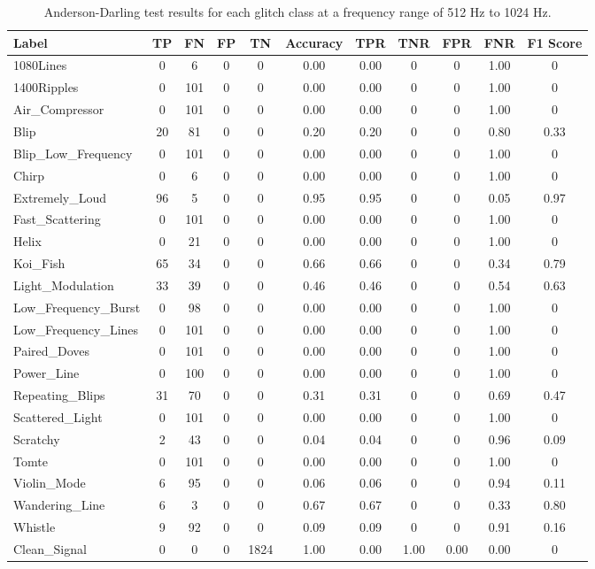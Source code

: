 \documentclass[12pt]{article}
\begin{document}
\begin{table}[H]
  \begin{tabular}{lcccccccccc}
  \toprule
  Label & TP & FN & FP & TN & Accuracy & TPR & TNR & FPR & FNR & F1 Score \\
  \midrule
  1080Lines & 0 & 6 & 0 & 0 & 0.00 & 0.00 & 0 & 0 & 1.00 & 0 \\
  1400Ripples & 0 & 101 & 0 & 0 & 0.00 & 0.00 & 0 & 0 & 1.00 & 0 \\
  Air\_Compressor & 0 & 101 & 0 & 0 & 0.00 & 0.00 & 0 & 0 & 1.00 & 0 \\
  Blip & 20 & 81 & 0 & 0 & 0.20 & 0.20 & 0 & 0 & 0.80 & 0.33 \\
  Blip\_Low\_Frequency & 0 & 101 & 0 & 0 & 0.00 & 0.00 & 0 & 0 & 1.00 & 0 \\
  Chirp & 0 & 6 & 0 & 0 & 0.00 & 0.00 & 0 & 0 & 1.00 & 0 \\
  Extremely\_Loud & 96 & 5 & 0 & 0 & 0.95 & 0.95 & 0 & 0 & 0.05 & 0.97 \\
  Fast\_Scattering & 0 & 101 & 0 & 0 & 0.00 & 0.00 & 0 & 0 & 1.00 & 0 \\
  Helix & 0 & 21 & 0 & 0 & 0.00 & 0.00 & 0 & 0 & 1.00 & 0 \\
  Koi\_Fish & 65 & 34 & 0 & 0 & 0.66 & 0.66 & 0 & 0 & 0.34 & 0.79 \\
  Light\_Modulation & 33 & 39 & 0 & 0 & 0.46 & 0.46 & 0 & 0 & 0.54 & 0.63 \\
  Low\_Frequency\_Burst & 0 & 98 & 0 & 0 & 0.00 & 0.00 & 0 & 0 & 1.00 & 0 \\
  Low\_Frequency\_Lines & 0 & 101 & 0 & 0 & 0.00 & 0.00 & 0 & 0 & 1.00 & 0 \\
  Paired\_Doves & 0 & 101 & 0 & 0 & 0.00 & 0.00 & 0 & 0 & 1.00 & 0 \\
  Power\_Line & 0 & 100 & 0 & 0 & 0.00 & 0.00 & 0 & 0 & 1.00 & 0 \\
  Repeating\_Blips & 31 & 70 & 0 & 0 & 0.31 & 0.31 & 0 & 0 & 0.69 & 0.47 \\
  Scattered\_Light & 0 & 101 & 0 & 0 & 0.00 & 0.00 & 0 & 0 & 1.00 & 0 \\
  Scratchy & 2 & 43 & 0 & 0 & 0.04 & 0.04 & 0 & 0 & 0.96 & 0.09 \\
  Tomte & 0 & 101 & 0 & 0 & 0.00 & 0.00 & 0 & 0 & 1.00 & 0 \\
  Violin\_Mode & 6 & 95 & 0 & 0 & 0.06 & 0.06 & 0 & 0 & 0.94 & 0.11 \\
  Wandering\_Line & 6 & 3 & 0 & 0 & 0.67 & 0.67 & 0 & 0 & 0.33 & 0.80 \\
  Whistle & 9 & 92 & 0 & 0 & 0.09 & 0.09 & 0 & 0 & 0.91 & 0.16 \\
  Clean\_Signal & 0 & 0 & 0 & 1824 & 1.00 & 0.00 & 1.00 & 0.00 & 0.00 & 0 \\
  \bottomrule
  \end{tabular}
  \caption{Anderson-Darling test results for each glitch class at a frequency range of 512 Hz to 1024 Hz.}
  \label{tab:ad_high_frequency_results}
\end{table}
\end{document}
